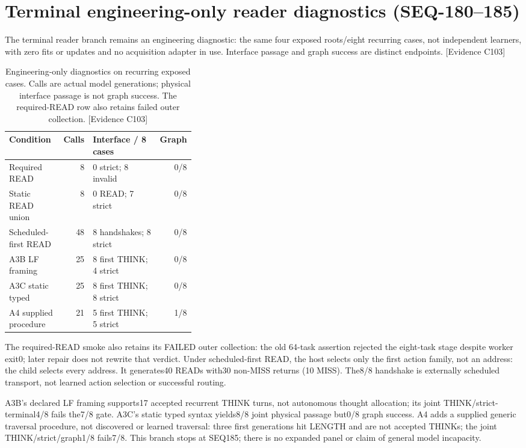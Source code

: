 \documentclass[11pt]{article}
\newcommand{\ev}[1]{\textsf{[Evidence #1]}}
\begin{document}
\section{Terminal engineering-only reader diagnostics (SEQ-180--185)}
The terminal reader branch remains an engineering diagnostic: the same four
exposed roots/eight recurring cases, not independent learners, with zero fits
or updates and no acquisition adapter in use. Interface passage and graph
success are distinct endpoints. \ev{C103}

\begin{table}[ht]
\centering\small
\begin{tabular}{lrp{0.36\linewidth}r}
\toprule
Condition & Calls & Interface / 8 cases & Graph \\
\midrule
Required READ & 8 & 0 strict; 8 invalid & 0/8 \\
Static READ union & 8 & 0 READ; 7 strict & 0/8 \\
Scheduled-first READ & 48 & 8 handshakes; 8 strict & 0/8 \\
A3B LF framing & 25 & 8 first THINK; 4 strict & 0/8 \\
A3C static typed & 25 & 8 first THINK; 8 strict & 0/8 \\
A4 supplied procedure & 21 & 5 first THINK; 5 strict & 1/8 \\
\bottomrule
\end{tabular}
\caption{Engineering-only diagnostics on recurring exposed cases. Calls are
actual model generations; physical interface passage is not graph success.
The required-READ row also retains failed outer collection. \ev{C103}}
\end{table}

The required-READ smoke also retains its FAILED outer collection: the old
64-task assertion rejected the eight-task stage despite worker exit0; later
repair does not rewrite that verdict. Under scheduled-first READ, the host
selects only the first action family, not an address: the child selects every
address. It generates40 READs with30 non-MISS returns (10 MISS). The8/8
handshake is externally scheduled transport, not learned action selection or
successful routing.

A3B's declared LF framing supports17 accepted recurrent THINK turns, not
autonomous thought allocation; its joint THINK/strict-terminal4/8 fails the7/8
gate. A3C's static typed syntax yields8/8 joint physical passage but0/8 graph
success. A4 adds a supplied generic traversal procedure, not discovered or
learned traversal: three first generations hit LENGTH and are not accepted
THINKs; the joint THINK/strict/graph1/8 fails7/8. This branch stops at SEQ185;
there is no expanded panel or claim of general model incapacity.
\end{document}
